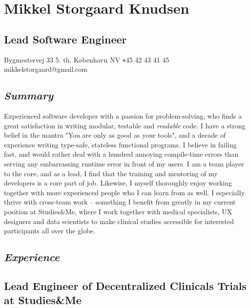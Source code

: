 \documentclass[10pt, a4paper]{article}
\newcommand{\sme}{Studies\&Me}
\begin{document}
\section*{Mikkel Storgaard Knudsen}
\subsection*{Lead Software Engineer}
Bygmestervej 33 5. th.  København NV \newline
\texttt{+}45 42 43 41 45 \newline
mikkelstorgaard@gmail.com
\subsection*{\textit{Summary}}
Experienced software developer with a passion for problem-solving, who finds a great satisfaction in writing modular, testable and \textit{readable} code. I have a strong belief in the mantra "You are only as good as your tools", and a decade of experience writing type-safe, stateless functional programs. \newline
I believe in failing fast, and would rather deal with a hundred annoying compile-time errors than serving any embarrassing runtime error in front of my users. \newline
I am a team player to the core, and as a lead, I find that the training and mentoring of my developers is a core part of job. Likewise, I myself thoroughly enjoy working together with more experienced people who I can learn from as well. I especially thrive with cross-team work -- something I benefit from greatly in my current position at \sme, where I work together with medical specialists, UX designers and data scientists to make clinical studies accessible for interested participants all over the globe.

\subsection*{\textit{Experience}}
\subsection*{Lead Engineer of Decentralized Clinicals Trials at \sme}
\end{document}
